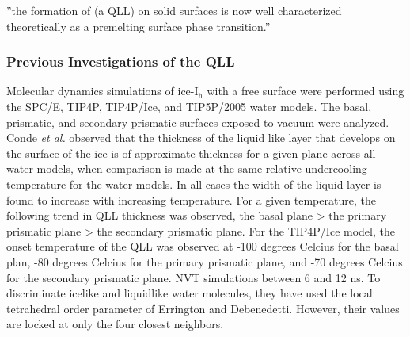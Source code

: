 ''the formation of (a QLL) on solid surfaces is now well characterized
theoretically as a premelting surface phase
transition.''\cite{R. Lipowsky, Phys. Rev. Lett. 49, 1575 (1982).}

\subsubsection{Previous Investigations of the QLL}
Molecular dynamics simulations of ice-I$_\mathrm{h}$ with a free
surface were performed using the SPC/E, TIP4P, TIP4P/Ice, and
TIP5P/2005 water models. The basal, prismatic, and secondary prismatic
surfaces exposed to vacuum were analyzed. Conde \textit{et al.}
observed that the thickness of the liquid like layer that develops on
the surface of the ice is of approximate thickness for a given plane
across all water models, when comparison is made at the same relative
undercooling temperature for the water models.\cite{Conde2008} In all cases the width
of the liquid layer is found to increase with increasing
temperature. For a given temperature, the following trend in QLL
thickness was observed, the basal plane > the primary prismatic plane
> the secondary prismatic plane. For the TIP4P/Ice model, the onset
temperature of the QLL was observed at -100 degrees Celcius for the
basal plan, -80 degrees Celcius for the primary prismatic plane, and
-70 degrees Celcius for the secondary prismatic plane. NVT simulations
between 6 and 12 ns. To discriminate icelike and liquidlike water
molecules, they have used the local tetrahedral order parameter of
Errington and Debenedetti. However, their values are locked at only
the four closest neighbors. 

